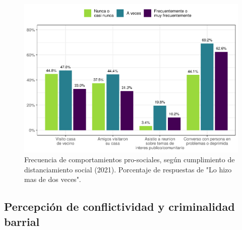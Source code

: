 \documentclass[
  12pt,
]{book}
\begin{document}
\begin{figure}

{\centering \includegraphics{reporte-elsoc_files/figure-latex/dist-pros2-1} 

}

\caption{Frecuencia de comportamientos pro-sociales, según cumplimiento de distanciamiento social (2021). Porcentaje de respuestas de "Lo hizo mas de dos veces".}\label{fig:dist-pros2}
\end{figure}

\hypertarget{percepciuxf3n-de-conflictividad-y-criminalidad-barrial}{%
\subsection{Percepción de conflictividad y criminalidad barrial}\label{percepciuxf3n-de-conflictividad-y-criminalidad-barrial}}
\end{document}
